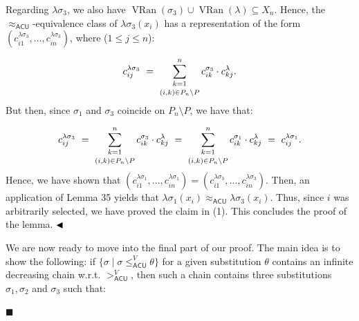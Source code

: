 \documentclass[10pt,a4paper]{amsart}
\begin{document}
Regarding $\lambda\sigma_{3}$, we also have $\operatorname{VRan}(\sigma_{3})\cup\operatorname{VRan}(\lambda)\subseteq X_{n}$. Hence, the $\approx_{\mathsf{ACU}}$-equivalence class of $\lambda\sigma_{3}(x_{i})$ has a representation of the form $(c^{\lambda\sigma_{3}}_{i1},\ldots,c^{\lambda\sigma_{3}}_{in})$, where ($1\leq j\leq n$):\par
    \[c^{\lambda\sigma_{3}}_{ij}\ =\ \sum_{\begin{subarray}{c}k=1\\[2.45836pt]
(i,k)\in P_{n}\setminus P\end{subarray}}^{n}c^{\sigma_{3}}_{ik}\cdot c^{%
\lambda}_{kj}.\]    
But then, since $\sigma_{1}$ and $\sigma_{3}$ coincide on $P_{n}\setminus P$, we have that:\par
    \[c^{\lambda\sigma_{3}}_{ij}\ =\ \sum_{\begin{subarray}{c}k=1\\[2.45836pt]
(i,k)\in P_{n}\setminus P\end{subarray}}^{n}c^{\sigma_{3}}_{ik}\cdot c^{%
\lambda}_{kj}\ =\ \sum_{\begin{subarray}{c}k=1\\[2.45836pt]
(i,k)\in P_{n}\setminus P\end{subarray}}^{n}c^{\sigma_{1}}_{ik}\cdot c^{%
\lambda}_{kj}\ =\ c^{\lambda\sigma_{1}}_{ij}.\]    
Hence, we have shown that $(c^{\lambda\sigma_{1}}_{i1},\ldots,c^{\lambda\sigma_{1}}_{in})=(c^{\lambda%
\sigma_{3}}_{i1},\ldots,c^{\lambda\sigma_{3}}_{in})$. Then, an application of Lemma 35 yields that $\lambda\sigma_{1}(x_{i})\approx_{\mathsf{ACU}}\lambda\sigma_{3}(x_{i})$. Thus, since $i$ was arbitrarily selected, we have proved the claim in (1). This concludes the proof of the lemma. $\hfill\blacktriangleleft$\par
 
 
 
We are now ready to move into the final part of our proof. The main idea is to show the following: if $\{\sigma\mid\sigma\leq_{\mathsf{ACU}}^{V}\theta\}$ for a given substitution $\theta$ contains an infinite decreasing chain w.r.t. $>_{\mathsf{ACU}}^{V}$, then such a chain contains three substitutions $\sigma_{1},\sigma_{2}$ and $\sigma_{3}$ such that:\par
  
\par\noindent  $\blacksquare$ 
 
\end{document}
